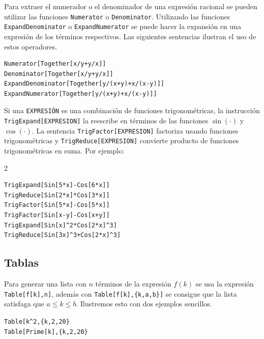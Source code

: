 Para extraer el numerador o el denominador de una expresión racional se pueden utilizar
las funciones \verb"Numerator" o \verb"Denominator".
Utilizando las funciones \verb"ExpandDenominator" o \verb"ExpandNumerator"
se puede hacer la expansión en una expresión de los términos respectivos.
Las siguientes sentencias ilustran el uso de estos operadores.
   
\begin{tcolorbox}[title=Usos de \verb"ExpandDenominator" y \verb"ExpandNumerator"]
\begin{Verbatim}[formatcom=\letraverbatim]
Numerator[Together[x/y+y/x]]
Denominator[Together[x/y+y/x]]
ExpandDenominator[Together[y/(x+y)+x/(x-y)]]
ExpandNumerator[Together[y/(x+y)+x/(x-y)]]
\end{Verbatim}
\end{tcolorbox}

  
Si una \verb"EXPRESIÓN" es una combinación de funciones trigonométricas, la instrucción
\verb"TrigExpand[EXPRESION]" la reescribe en términos de las funciones $\sin(\cdot)$ y $\cos(\cdot)$.
La sentencia \verb"TrigFactor[EXPRESION]" factoriza usando funciones trigonométricas y
\verb"TrigReduce[EXPRESION]" convierte producto de funciones trigonométricas en suma.
Por ejemplo:

\begin{tcolorbox}
  \begin{multicols}{2}
\begin{Verbatim}[formatcom=\letraverbatim]
TrigExpand[Sin[5*x]-Cos[6*x]]
TrigReduce[Sin[2*x]*Cos[3*x]]
TrigFactor[Sin[5*x]-Cos[5*x]]
TrigFactor[Sin[x-y]-Cos[x+y]]
TrigExpand[Sin[x]^2*Cos[2*x]^3]
TrigReduce[Sin[3x]^3+Cos[2*x]^3]
\end{Verbatim}
  \end{multicols}
\end{tcolorbox}

\subsection{Tablas}
Para generar una lista con $n$ términos de la expresión $f(k)$ se usa la expresión \verb"Table[f[k],n]", además
con \verb"Table[f[k],{k,a,b}]" se consigue que la lista satisfaga que $a \leq k \leq b$. 
Ilustremos esto con dos ejemplos sencillos.

\begin{tcolorbox}
  \verb"Table[k^2,{k,2,20}"\\
    \verb"Table[Prime[k],{k,2,20}"
    \end{tcolorbox}

